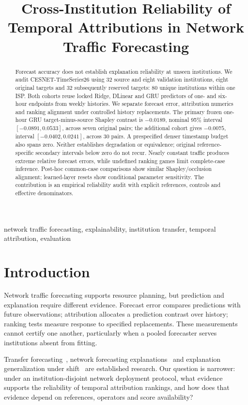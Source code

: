 \documentclass[conference]{IEEEtran}
\title{Cross-Institution Reliability of Temporal Attributions in Network Traffic Forecasting}
\author{\IEEEauthorblockN{Anonymous research draft}\IEEEauthorblockA{Conference draft; authors and venue to be finalized}}
\begin{document}
\raggedbottom\maketitle
\begin{abstract}
Forecast accuracy does not establish explanation reliability at unseen institutions. We audit CESNET-TimeSeries26 using 32 source and eight validation institutions, eight original targets and 32 subsequently reserved targets: 80 unique institutions within one ISP. Both cohorts reuse locked Ridge, DLinear and GRU predictors of one- and six-hour endpoints from weekly histories. We separate forecast error, attribution numerics and ranking alignment under controlled history replacements. The primary frozen one-hour GRU target-minus-source Shapley contrast is $-0.0189$, nominal 95\% interval $[-0.0891,0.0533]$, across seven original pairs; the additional cohort gives $-0.0075$, interval $[-0.0402,0.0241]$, across 30 pairs. A prespecified denser timestamp budget also spans zero. Neither establishes degradation or equivalence; original reference-specific secondary intervals below zero do not recur. Nearly constant traffic produces extreme relative forecast errors, while undefined ranking games limit complete-case inference. Post-hoc common-case comparisons show similar Shapley/occlusion alignment; learned-layer resets show conditional parameter sensitivity. The contribution is an empirical reliability audit with explicit references, controls and effective denominators.
\end{abstract}
\begin{IEEEkeywords}network traffic forecasting, explainability, institution transfer, temporal attribution, evaluation\end{IEEEkeywords}

\section{Introduction}
Network traffic forecasting supports resource planning, but prediction and explanation require different evidence. Forecast error compares predictions with future observations; attribution allocates a prediction contrast over history; ranking tests measure response to specified replacements. These measurements cannot certify one another, particularly when a pooled forecaster serves institutions absent from fitting.

Transfer forecasting~\cite{transmuse}, network forecasting explanations~\cite{aichrono} and explanation generalization under shift~\cite{timesae} are established research. Our question is narrower: under an institution-disjoint network deployment protocol, what evidence supports the reliability of temporal attribution rankings, and how does that evidence depend on references, operators and score availability?
\end{document}
